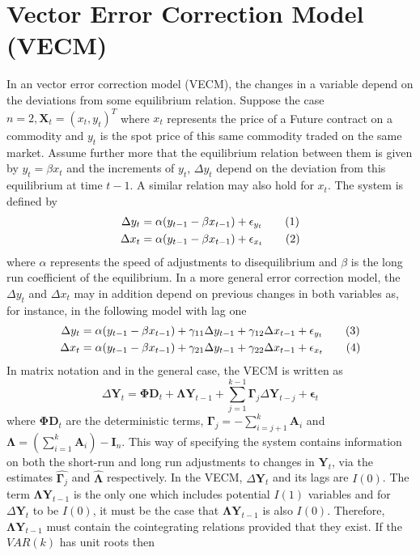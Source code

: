\documentclass[11pt,a4,twosided,singlespacing,titlepagenumber=on]{scrreprt}
\numberwithin{equation}{chapter} %
\theoremstyle{remark}
\newcommand{\matr}[1]{\mathbf{#1}}
\newcommand\numberthis{\addtocounter{equation}{1}\tag{\theequation}}
\begin{document}
\section{Vector Error Correction Model (VECM)}
In an vector error correction model (VECM), the changes in a variable depend on the deviations from some equilibrium relation. Suppose the case $n=2, \matr{X}_t = (x_t, y_t)^T$ where $x_t$ represents the price of a Future contract on a commodity and $y_t$ is the spot price of this same commodity traded on the same market. Assume further more that the equilibrium relation between them is given by $y_t = \beta x_t$ and the increments of $y_t$, $\Delta y_t$ depend on the deviation from this equilibrium at time $t-1$. A similar relation may also hold for $x_t$. The system is defined by
\begin{align*}
\Delta y_t &= \alpha (y_{t-1} - \beta x_{t-1}) + \epsilon_{y_t} \numberthis \\
\Delta x_t &= \alpha (y_{t-1} - \beta x_{t-1}) + \epsilon_{x_t} \numberthis
\end{align*}
where $\alpha$ represents the speed of adjustments to disequilibrium and $\beta$ is the long run coefficient of the equilibrium. In a more general error correction model, the $\Delta y_t$ and $\Delta x_t$ may in addition depend on previous changes in both variables as, for instance, in the following model with lag one
\begin{align*}
\Delta y_t &= \alpha (y_{t-1} - \beta x_{t-1}) + \gamma_{11} \Delta y_{t-1} + \gamma_{12} \Delta x_{t-1} + \epsilon_{y_t} \numberthis \\
\Delta x_t &= \alpha (y_{t-1} - \beta x_{t-1}) + \gamma_{21} \Delta y_{t-1} + \gamma_{22} \Delta x_{t-1} + \epsilon_{x_t} \numberthis
\end{align*}
In matrix notation and in the general case, the VECM is written as
\begin{equation}
\Delta \matr{Y}_t = \matr{\Phi} \matr{D}_t + \matr{\Lambda} \matr{Y}_{t-1} + \sum_{j=1}^{k-1} \matr{\Gamma}_j \Delta \matr{Y}_{t-j} + \matr{\epsilon}_t
\end{equation}
where $\matr{\Phi} \matr{D}_t$ are the deterministic terms, $\matr{\Gamma}_j = - \sum_{i=j+1}^k \matr{A}_i$ and $\matr{\Lambda} = \left(\sum_{i=1}^k \matr{A}_i \right) - \matr{I}_n$. This way of specifying the system contains information on both the short-run and long run adjustments to changes in $\matr{Y}_t$, via the estimates $\hat{\matr{\Gamma}_j}$ and $\hat{\matr{\Lambda}}$ respectively. In the VECM, $\Delta \matr{Y}_t$ and its lags are $I(0)$. The term $\matr{\Lambda} \matr{Y}_{t-1}$ is the only one which includes potential $I(1)$ variables and for $\Delta \matr{Y}_t$ to be $I(0)$, it must be the case that $\matr{\Lambda} \matr{Y}_{t-1}$ is also $I(0)$. Therefore, $\matr{\Lambda} \matr{Y}_{t-1}$ must contain the cointegrating relations provided that they exist. If the $VAR(k)$ has unit roots then 
\end{document}
